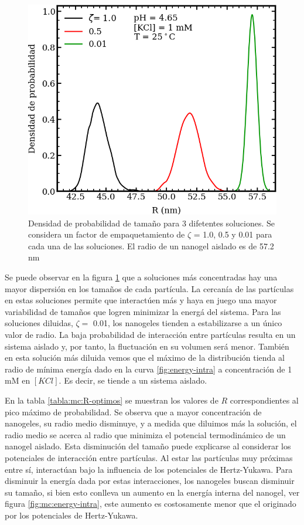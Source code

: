 	\begin{figure}
		\centering
		\includegraphics[width=0.45\linewidth]{Figures/graph-mc/size-zetas.png}
		\caption{Densidad de probabilidad de tama\~no para 3 difetentes soluciones. Se considera un factor de empaquetamiento de $\zeta$ = 1.0, 0.5 y 0.01 para cada una de las soluciones. El radio de un nanogel aislado es de 57.2 nm}
		\label{fig:mc:densidad-probabilidad}
	\end{figure}
	
	Se puede observar en la figura \ref{fig:mc:densidad-probabilidad} que a soluciones m\'as concentradas hay una mayor dispersi\'on en los tama\~nos de cada part\'icula. La cercan\'ia de las part\'iculas en estas soluciones permite que interact\'uen m\'as y haya en juego una mayor variabilidad de tama\~nos que logren minimizar la energ\'a del sistema.
	Para las soluciones diluidas, $\zeta =$ 0.01, los nanogeles tienden a estabilizarse a un \'unico valor de radio. La baja probabilidad de interacción entre part\'iculas resulta en un sistema aislado y, por tanto, la fluctuaci\'on en su volumen ser\'a menor.
	Tambi\'en en esta soluci\'on m\'as diluida vemos que el m\'aximo de la distribuci\'on tienda al radio de m\'inima energ\'ia dado en la curva \ref{fig:energy-intra} a concentración de 1 mM en  $[KCl]$. Es decir, se tiende a un sistema aislado.
	
	En la tabla \ref{tabla:mc:R-optimos} se muestran los valores de $R$ correspondientes al pico m\'aximo de probabilidad. Se observa que a mayor concentraci\'on de nanogeles, su radio medio disminuye, y a medida que diluimos m\'as la soluci\'on, el radio medio se acerca al radio que minimiza el potencial termodin\'amico de un nanogel aislado.
	Esta disminuci\'on del tama\~no puede explicarse al considerar los potenciales de interacci\'on entre part\'iculas. Al estar las part\'iculas muy pr\'oximas entre s\'i, interact\'uan bajo la influencia de los potenciales de Hertz-Yukawa. Para disminuir la energ\'ia dada por estas interacciones, los nanogeles buscan disminuir su tama\~no, si bien esto conlleva un aumento en la energ\'ia interna del nanogel, ver figura \ref{fig:mc:energy-intra}, este aumento es costosamente menor que el originado por los potenciales de Hertz-Yukawa.
	
